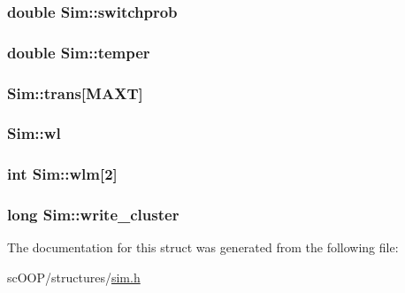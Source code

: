 \hypertarget{struct_sim_a71dacb1d9da362be221fa89a27dc47bc}{
\subsubsection[{switchprob}]{\setlength{\rightskip}{0pt plus 5cm}double Sim\+::switchprob}}\label{struct_sim_a71dacb1d9da362be221fa89a27dc47bc}
\hypertarget{struct_sim_aa181060fddbb0694234034de7642f56a}{
\subsubsection[{temper}]{\setlength{\rightskip}{0pt plus 5cm}double Sim\+::temper}}\label{struct_sim_aa181060fddbb0694234034de7642f56a}
\hypertarget{struct_sim_a72db680d42b459fad8362d37914ae9a8}{
\subsubsection[{trans}]{ Sim\+::trans\mbox{[}{\bf M\+A\+X\+T}\mbox{]}}}\label{struct_sim_a72db680d42b459fad8362d37914ae9a8}
\hypertarget{struct_sim_ade98939300538c5d79e144d8c583b258}{
\subsubsection[{wl}]{ Sim\+::wl}}\label{struct_sim_ade98939300538c5d79e144d8c583b258}
\hypertarget{struct_sim_a43570c2d1a73631e8c00f5512a8486b6}{
\subsubsection[{wlm}]{\setlength{\rightskip}{0pt plus 5cm}int Sim\+::wlm\mbox{[}2\mbox{]}}}\label{struct_sim_a43570c2d1a73631e8c00f5512a8486b6}
\hypertarget{struct_sim_ae3f308ef99bae8099bb581b89618ba09}{
\subsubsection[{write\+\_\+cluster}]{\setlength{\rightskip}{0pt plus 5cm}long Sim\+::write\+\_\+cluster}}\label{struct_sim_ae3f308ef99bae8099bb581b89618ba09}


The documentation for this struct was generated from the following file\+:\begin{DoxyCompactItemize}
\item 
sc\+O\+O\+P/structures/\hyperlink{sim_8h}{sim.\+h}\end{DoxyCompactItemize}
